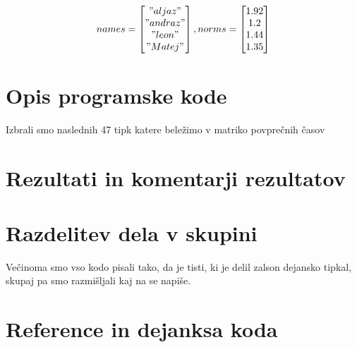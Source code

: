\documentclass[12pt]{article}
\begin{document}
\[
  names = \begin{bmatrix}
    "aljaz"\\
    "andraz"\\
    "leon"\\
    "Matej"
  \end{bmatrix},
  norms = \begin{bmatrix}
    1.92\\
    1.2\\
    1.44\\
    1.35
  \end{bmatrix}
\]
\section{Opis programske kode}
Izbrali smo naslednih 47 tipk katere beležimo v matriko povprečnih časov

\section{Rezultati in komentarji rezultatov}

\section{Razdelitev dela v skupini}
Večinoma smo vso kodo pisali tako, da je tisti, ki je delil zalson dejansko tipkal,
skupaj pa smo razmišljali kaj na se napiše. 
\section{Reference in dejanksa koda}
\end{document}
